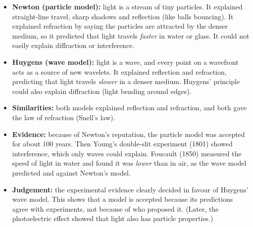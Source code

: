 \documentclass[12pt]{article}
\begin{document}
\ansq
\begin{crit}
\end{crit}
\sample
\begin{itemize}
  \item \textbf{Newton (particle model):} light is a stream of tiny particles. It explained straight-line
        travel, sharp shadows and reflection (like balls bouncing). It explained refraction by saying the
        particles are attracted by the denser medium, so it predicted that light travels \emph{faster} in
        water or glass. It could not easily explain diffraction or interference.
  \item \textbf{Huygens (wave model):} light is a wave, and every point on a wavefront acts as a source of
        new wavelets. It explained reflection and refraction, predicting that light travels \emph{slower}
        in a denser medium. Huygens' principle could also explain diffraction (light bending around edges).
  \item \textbf{Similarities:} both models explained reflection and refraction, and both gave the law of
        refraction (Snell's law).
  \item \textbf{Evidence:} because of Newton's reputation, the particle model was accepted for about 100
        years. Then Young's double-slit experiment (1801) showed interference, which only waves could
        explain. Foucault (1850) measured the speed of light in water and found it was \emph{lower} than in
        air, as the wave model predicted and against Newton's model.
  \item \textbf{Judgement:} the experimental evidence clearly decided in favour of Huygens' wave model. This
        shows that a model is accepted because its predictions agree with experiments, not because of who
        proposed it. (Later, the photoelectric effect showed that light also has particle properties.)
\end{itemize}
\end{document}
